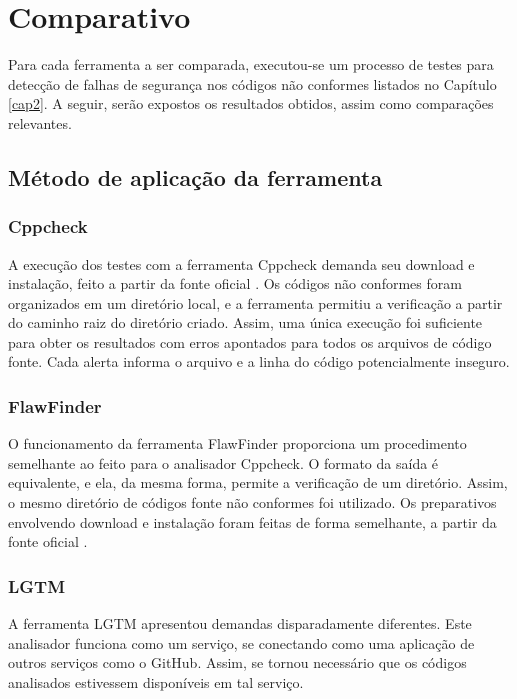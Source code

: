 \chapter{Comparativo}
\label{cap3}

Para cada ferramenta a ser comparada, executou-se um processo de testes para detecção de falhas de segurança nos códigos não conformes listados no Capítulo \ref{cap2}. A seguir, serão expostos os resultados obtidos, assim como comparações relevantes.

\section{Método de aplicação da ferramenta}

\subsection{Cppcheck}

A execução dos testes com a ferramenta Cppcheck demanda seu download e instalação, feito a partir da fonte oficial \cite{cppcheck}. Os códigos não conformes foram organizados em um diretório local, e a ferramenta permitiu a verificação a partir do caminho raiz do diretório criado. Assim, uma única execução foi suficiente para obter os resultados com erros apontados para todos os arquivos de código fonte. Cada alerta informa o arquivo e a linha do código potencialmente inseguro.

\subsection{FlawFinder}

O funcionamento da ferramenta FlawFinder proporciona um procedimento semelhante ao feito para o analisador Cppcheck. O formato da saída é equivalente, e ela, da mesma forma, permite a verificação de um diretório. Assim, o mesmo diretório de códigos fonte não conformes foi utilizado. Os preparativos envolvendo download e instalação foram feitas de forma semelhante, a partir da fonte oficial \cite{flawfinder}.

\subsection{LGTM}

A ferramenta LGTM apresentou demandas disparadamente diferentes. Este analisador funciona como um serviço, se conectando como uma aplicação de outros serviços como o GitHub. Assim, se tornou necessário que os códigos analisados estivessem disponíveis em tal serviço.

